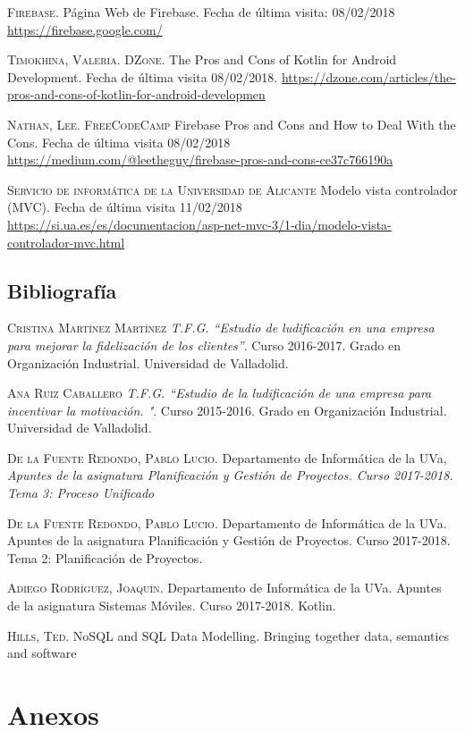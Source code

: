\documentclass[twoside]{report}
\begin{document}
\begin{thebibliography}{a}
 \textsc{Firebase}. Página Web de Firebase. Fecha de última visita: 08/02/2018 \url{https://firebase.google.com/}

 \textsc{Timokhina, Valeria. DZone}. The Pros and Cons of Kotlin for Android Development. Fecha de última visita 08/02/2018. \url{https://dzone.com/articles/the-pros-and-cons-of-kotlin-for-android-developmen}

 \textsc{Nathan, Lee. FreeCodeCamp} Firebase Pros and Cons and How to Deal With the Cons. Fecha de última visita 08/02/2018 \url{https://medium.com/@leetheguy/firebase-pros-and-cons-ce37c766190a}

 \textsc{Servicio de informática de la Universidad de Alicante} Modelo vista controlador (MVC). Fecha de última visita 11/02/2018 \url{https://si.ua.es/es/documentacion/asp-net-mvc-3/1-dia/modelo-vista-controlador-mvc.html}



\section{Bibliografía}

 \textsc{Cristina Martínez Martínez} \textit{T.F.G. “Estudio de ludificación en una empresa para mejorar la fidelización de los clientes”}. Curso 2016-2017. Grado en Organización Industrial. Universidad de Valladolid. 

 \textsc{Ana Ruiz Caballero} \textit{T.F.G. “Estudio de la ludificación de una empresa para incentivar la motivación. "}. Curso 2015-2016. Grado en Organización Industrial. Universidad de Valladolid. 

 \textsc{De la Fuente Redondo, Pablo Lucio}. Departamento de Informática de la UVa, \textit{Apuntes de la asignatura Planificación y Gestión de Proyectos. Curso 2017-2018. Tema 3: Proceso Unificado}

 \textsc{De la Fuente Redondo, Pablo Lucio}. Departamento de Informática de la UVa. Apuntes de la asignatura Planificación y Gestión de Proyectos. Curso 2017-2018. Tema 2: Planificación de Proyectos.

 \textsc{Adiego Rodríguez, Joaquín}. Departamento de Informática de la UVa. Apuntes de la asignatura Sistemas Móviles. Curso 2017-2018. Kotlin.

 \textsc{Hills, Ted}. NoSQL and SQL Data Modelling. Bringing together data, semantics and software



\end{thebibliography}

\chapter{Anexos}
\end{document}
